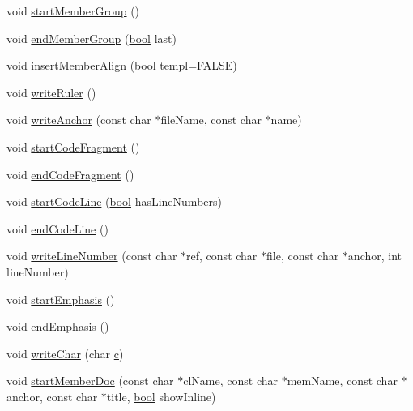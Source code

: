 \begin{DoxyCompactItemize}
void \hyperlink{class_output_list_a6e6c176d640939fce848f044037209c8}{start\+Member\+Group} ()
\item 
void \hyperlink{class_output_list_ac38b30488a0d82de3aa04b7ae30ed48e}{end\+Member\+Group} (\hyperlink{qglobal_8h_a1062901a7428fdd9c7f180f5e01ea056}{bool} last)
\item 
void \hyperlink{class_output_list_a8a0967d0442047bfe07a5644505c2d68}{insert\+Member\+Align} (\hyperlink{qglobal_8h_a1062901a7428fdd9c7f180f5e01ea056}{bool} templ=\hyperlink{qglobal_8h_a10e004b6916e78ff4ea8379be80b80cc}{F\+A\+L\+S\+E})
\item 
void \hyperlink{class_output_list_a2203589f0bc276cb3ba01f529b9536a9}{write\+Ruler} ()
\item 
void \hyperlink{class_output_list_af547c76944d466ab7c66ab31b32bde13}{write\+Anchor} (const char $\ast$file\+Name, const char $\ast$name)
\item 
void \hyperlink{class_output_list_ae9d700d50e148d13422052cd58243624}{start\+Code\+Fragment} ()
\item 
void \hyperlink{class_output_list_a9fccddf083f487654f6e6ce261fafff8}{end\+Code\+Fragment} ()
\item 
void \hyperlink{class_output_list_a4676ca4801912753ba2c5af4f38cb951}{start\+Code\+Line} (\hyperlink{qglobal_8h_a1062901a7428fdd9c7f180f5e01ea056}{bool} has\+Line\+Numbers)
\item 
void \hyperlink{class_output_list_a0e08c34eb6d9058342d0bd7fdc2a453d}{end\+Code\+Line} ()
\item 
void \hyperlink{class_output_list_a9472c77d09f7049b64dbad0c4ba13ccd}{write\+Line\+Number} (const char $\ast$ref, const char $\ast$file, const char $\ast$anchor, int line\+Number)
\item 
void \hyperlink{class_output_list_aba5576798309803175cefaedf33b2a28}{start\+Emphasis} ()
\item 
void \hyperlink{class_output_list_a5674d5d9336eb1f7f6cb83c058f5ad8f}{end\+Emphasis} ()
\item 
void \hyperlink{class_output_list_a188c7a8f0a0dc35ec5ea0f8b4a491d33}{write\+Char} (char \hyperlink{060__command__switch_8tcl_ab14f56bc3bd7680490ece4ad7815465f}{c})
\item 
void \hyperlink{class_output_list_a5882fee754cfd3a4070c61d0da20e508}{start\+Member\+Doc} (const char $\ast$cl\+Name, const char $\ast$mem\+Name, const char $\ast$anchor, const char $\ast$title, \hyperlink{qglobal_8h_a1062901a7428fdd9c7f180f5e01ea056}{bool} show\+Inline)
\item 

\end{DoxyCompactItemize}
